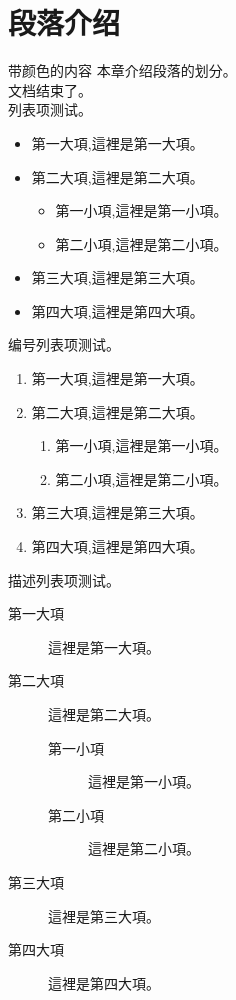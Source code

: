 \documentclass[12pt,a4paper]{report}
\begin{document}
\section{段落介绍}
\textcolor[rgb]{0.00, 0.50, 0.00}{带颜色的内容}
本章介绍段落的划分。\\
文档结束了。\\
列表项测试。
\begin{itemize}
        \item 第一大項,這裡是第一大項。
        \item 第二大項,這裡是第二大項。
                \begin{itemize}
                        \item 第一小項,這裡是第一小項。
                        \item 第二小項,這裡是第二小項。
                \end{itemize}
        \item 第三大項,這裡是第三大項。
        \item 第四大項,這裡是第四大項。
\end{itemize}
编号列表项测试。
\begin{enumerate}
        \item 第一大項,這裡是第一大項。
        \item 第二大項,這裡是第二大項。
                \begin{enumerate}
                        \item 第一小項,這裡是第一小項。
                        \item 第二小項,這裡是第二小項。
                \end{enumerate}
        \item 第三大項,這裡是第三大項。
        \item 第四大項,這裡是第四大項。
\end{enumerate}
描述列表项测试。
\begin{description}
        \item[第一大項] 這裡是第一大項。
        \item[第二大項] 這裡是第二大項。
                \begin{description}
                        \item[第一小項] 這裡是第一小項。
                        \item[第二小項] 這裡是第二小項。
                \end{description}
        \item[第三大項] 這裡是第三大項。
        \item[第四大項] 這裡是第四大項。
\end{description}
\newpage
\end{document}
